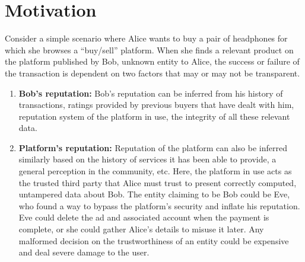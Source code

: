  
\section{Motivation}
Consider a simple scenario where Alice wants to buy a pair of headphones for
which she browses a ``buy/sell'' platform. When she finds a relevant product on the
platform published by Bob, unknown entity to Alice, the success or failure of
the transaction is dependent on two factors that may or may not be transparent.\\
\begin{enumerate}
	\item \textbf{Bob's reputation:} Bob's reputation can be inferred from his
		history of transactions, ratings provided by previous buyers that have
		dealt with him, reputation system of the platform in use, the integrity
		of all these relevant data. \\
	\item \textbf{Platform's reputation:} Reputation of the platform can also
		be inferred similarly based on the history of services it has been able
		to provide, a general perception in the community, etc.  Here, the
		platform in use acts as the trusted third party that Alice must trust
		to present correctly computed, untampered data about Bob. The entity
		claiming to be Bob could be Eve, who found a way to bypass the
		platform's security and inflate his reputation.  Eve could delete the
		ad and associated account when the payment is complete, or she could
		gather Alice's details to misuse it later.  Any malformed decision on
		the trustworthiness of an entity could be expensive and deal severe
		damage to the user.\\ 
\end{enumerate}

